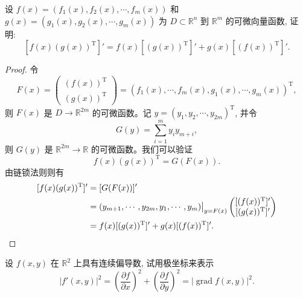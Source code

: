 \begin{example}\label{example:ma-14-2-4}
设 $f(x)=(f_1(x),f_2(x),\cdots,f_m(x))$ 和 $g(x)=(g_1(x),g_2(x),\cdots,g_m(x))$ 为 $D\subset\mathbb R^n$ 到 $\mathbb R^m$ 的可微向量函数, 证明:
\[
  [f(x)(g(x))^\mathrm T]'=f(x)[(g(x))^\mathrm T]'+g(x)[(f(x))^\mathrm T]'.
\]
\end{example}


\begin{proof}
令
\[
  F(x)=
  \begin{pmatrix}
    (f(x))^\mathrm T\\
    (g(x))^\mathrm T
  \end{pmatrix}
  =(f_1(x),\cdots,f_m(x),g_1(x),\cdots,g_m(x))^\mathrm T,
\]
则 $F(x)$ 是 $D\to\mathbb R^{2m}$ 的可微函数。记 $y=(y_1,y_2,\cdots,y_{2m})^\mathrm T$, 并令
\[
  G(y)=\sum_{i=1}^m y_i y_{m+i},
\]
则 $G(y)$ 是 $\mathbb R^{2m}\to\mathbb R$ 的可微函数。我们可以验证
\[
  f(x)(g(x))^\mathrm T=G(F(x)).
\]
由链锁法则则有
\[
\begin{aligned}
  [f(x)(g(x))^\mathrm T]'
  &=[G(F(x))]'\\
  &=(y_{m+1},\cdots,y_{2m},y_1,\cdots,y_m)\big|_{y=F(x)}
  \begin{pmatrix}
    [(f(x))^\mathrm T]'\\
    [(g(x))^\mathrm T]'
  \end{pmatrix}\\
  &=f(x)[(g(x))^\mathrm T]'+g(x)[(f(x))^\mathrm T]'.
\end{aligned}
\qedhere
\]
\end{proof}


\begin{example}\label{example:ma-14-2-5}
设 $f(x,y)$ 在 $\mathbb R^2$ 上具有连续偏导数, 试用极坐标来表示
\[
  |f'(x,y)|^2=
  \left(\frac{\partial f}{\partial x}\right)^2+
  \left(\frac{\partial f}{\partial y}\right)^2
  =|\operatorname{grad}f(x,y)|^2.
\]
\end{example}


